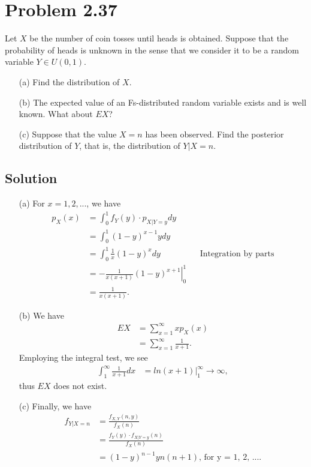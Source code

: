 \documentclass[10pt,a4paper]{article}
\theoremstyle{theorem}
\theoremstyle{definition}
\begin{document}
\section*{Problem 2.37}
Let $X$ be the number of coin tosses until heads is obtained. Suppose that the probability of heads is unknown in the sense that we consider it to be a random variable $Y \in U(0, 1)$.
\begin{enumerate}
\item[(a)] Find the distribution of $X$.
\item[(b)] The expected value of an Fs-distributed random variable exists and is well known. What about $EX$?
\item[(c)] Suppose that the value $X = n$ has been observed. Find the posterior distribution of $Y$, that is, the distribution of $Y|X = n$.
\end{enumerate}

\subsection*{Solution}
\begin{enumerate}
\item[(a)] For $x = 1, 2, ...$, we have
\begin{align*}
p_X(x) &= \int_0^1 f_Y(y) \cdot p_{X|Y = y} dy\\
&= \int_0^1 (1 - y)^{x-1} y dy\\
&= \int_0^1 \frac{1}{x}(1 - y)^x dy && \text{Integration by parts}\\
&= \left. - \frac{1}{x(x+1)} (1 - y)^{x+1} \right|_0^1\\
&= \boxed{\frac{1}{x(x+1)}}.
\end{align*}
\item[(b)] We have
\begin{align*}
EX &= \sum_{x = 1}^\infty x p_X(x)\\
&= \sum_{x = 1}^\infty \frac{1}{x+1}.
\end{align*}
Employing the integral test, we see
\begin{align*}
\int_1^\infty \frac{1}{x+1} dx &= \left. ln(x + 1) \right|_1^\infty \to \infty,
\end{align*}
thus $EX$ does not exist.
\item[(c)] Finally, we have
\begin{align*}
f_{Y|X=n} &= \frac{f_{X, Y}(n, y)}{f_X(n)}\\
&= \frac{f_Y(y) \cdot f_{X|Y=y}(n)}{f_X(n)}\\
&= \boxed{(1-y)^{n - 1} y n(n + 1) \text{, for y = 1, 2, ...}}.
\end{align*}
\end{enumerate}
\end{document}
